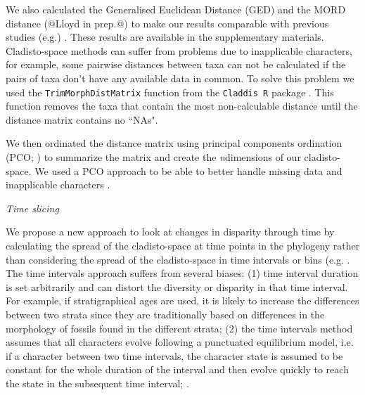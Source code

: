 \documentclass[12pt,letterpaper]{article}
\renewcommand{\subsection}[1]{%
\bigskip
\begin{center}
\begin{large}
\normalfont\itshape #1
\end{large}
\end{center}}
\begin{document}
We also calculated the Generalised Euclidean Distance (GED) \cite{Wills2001} and the MORD distance (@Lloyd in prep.@) to make our results comparable with previous studies (e.g.) 
. These results are available in the supplementary materials. %
Cladisto-space methods can suffer from problems due to inapplicable characters, for example, some pairwise distances between taxa can not be calculated if the pairs of taxa don't have any available data in common. To solve this problem we used the \texttt{TrimMorphDistMatrix} function from the \texttt{Claddis R} package \cite{Claddis}. This function removes the taxa that contain the most non-calculable distance until the distance matrix contains no ``NAs". 

We then ordinated the distance matrix using principal components ordination
(PCO; \cite{GOWER01121966}) to summarize the matrix and create the \textit{n}dimensions of our cladisto-space. We used a PCO approach to be able to better handle missing data and inapplicable characters \cite{lofgren2003,Wesley-Hunt2005}.

\subsection{Time slicing} %
We propose a new approach to look at changes in disparity
through time by calculating the spread of the cladisto-space at time points in the phylogeny rather than considering the spread of the cladisto-space in time intervals or bins (e.g. \cite{Brusatte12092008,brusattedinosaur2012,toljagictriassic-jurassic2013}. The time intervals approach suffers from several biases: (1) time interval duration is set arbitrarily and can distort the diversity or disparity in that time interval. For example, if stratigraphical ages are used, it is likely to increase the differences between two strata since they are traditionally based on differences in the morphology of fossils found in the different strata; (2) the time intervals method assumes that all characters evolve following a punctuated equilibrium model, i.e. if a character 
between two time intervals, the character state is assumed to be constant for the whole duration of the interval and then evolve quickly to reach the state in the subsequent time interval; \cite{Gould1977}. %
\end{document}
